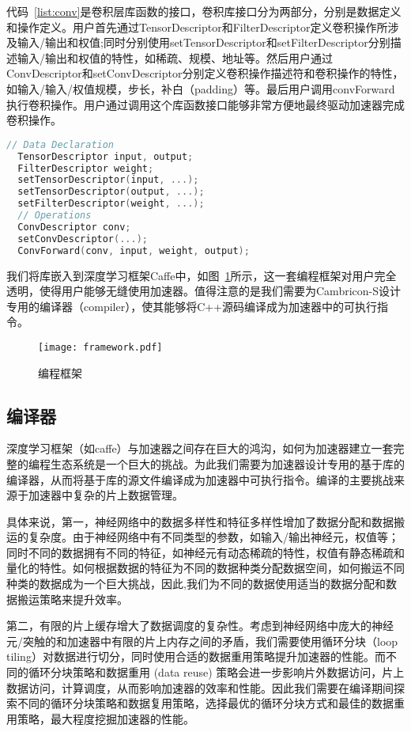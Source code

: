 代码~\ref{list:conv}是卷积层库函数的接口，卷积库接口分为两部分，分别是数据定义和操作定义。用户首先通过TensorDescriptor和FilterDescriptor定义卷积操作所涉及输入/输出和权值;同时分别使用setTensorDescriptor和setFilterDescriptor分别描述输入/输出和权值的特性，如稀疏、规模、地址等。然后用户通过ConvDescriptor和setConvDescriptor分别定义卷积操作描述符和卷积操作的特性，如输入/输入/权值规模，步长，补白（padding）等。最后用户调用convForward执行卷积操作。用户通过调用这个库函数接口能够非常方便地最终驱动加速器完成卷积操作。

\begin{lstlisting}[language=C, frame=single, basicstyle=\footnotesize, caption=卷积层库函数接口, label=list:conv, captionpos=b]
  // Data Declaration
  TensorDescriptor input, output;
  FilterDescriptor weight;
  setTensorDescriptor(input, ...);
  setTensorDescriptor(output, ...);
  setFilterDescriptor(weight, ...);
  // Operations
  ConvDescriptor conv;
  setConvDescriptor(...);
  ConvForward(conv, input, weight, output);
\end{lstlisting}

我们将库嵌入到深度学习框架Caffe中，如图~\ref{fig:framework}所示，这一套编程框架对用户完全透明，使得用户能够无缝使用加速器。值得注意的是我们需要为Cambricon-S设计专用的编译器（compiler），使其能够将C++源码编译成为加速器中的可执行指令。

\begin{figure}
\centering
\texttt{[image: framework.pdf]}
\caption{编程框架}
\label{fig:framework}
\end{figure}

\subsection{编译器}
深度学习框架（如caffe）与加速器之间存在巨大的鸿沟，如何为加速器建立一套完整的编程生态系统是一个巨大的挑战。为此我们需要为加速器设计专用的基于库的编译器，从而将基于库的源文件编译成为加速器中可执行指令。编译的主要挑战来源于加速器中复杂的片上数据管理。

具体来说，第一，神经网络中的数据多样性和特征多样性增加了数据分配和数据搬运的复杂度。由于神经网络中有不同类型的参数，如输入/输出神经元，权值等；同时不同的数据拥有不同的特征，如神经元有动态稀疏的特性，权值有静态稀疏和量化的特性。如何根据数据的特征为不同的数据种类分配数据空间，如何搬运不同种类的数据成为一个巨大挑战，因此,我们为不同的数据使用适当的数据分配和数据搬运策略来提升效率。

第二，有限的片上缓存增大了数据调度的复杂性。考虑到神经网络中庞大的神经元/突触的和加速器中有限的片上内存之间的矛盾，我们需要使用循环分块（loop tiling）对数据进行切分，同时使用合适的数据重用策略提升加速器的性能。而不同的循环分块策略和数据重用 (data reuse) 策略会进一步影响片外数据访问，片上数据访问，计算调度，从而影响加速器的效率和性能。因此我们需要在编译期间探索不同的循环分块策略和数据复用策略，选择最优的循环分块方式和最佳的数据重用策略，最大程度挖掘加速器的性能。

